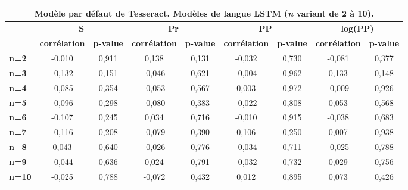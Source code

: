 \documentclass[10pt,twoside]{article}
\begin{document}
\begin{table}
\begin{center}
\begin{scriptsize}
\begin{tabular}{|l|c|c|c|c|c|c|c|c|}
    \multicolumn{9}{c}{{\footnotesize Modèle par défaut de Tesseract. Modèles de langue LSTM (\textit{n} variant de 2 à 10).}}\\\hline
    \multirow{2}{*}{\textbf{}} & \multicolumn{2}{c|}{\textbf{S}}         & \multicolumn{2}{c|}{\textbf{Pr}}        & \multicolumn{2}{c|}{\textbf{PP}}        & \multicolumn{2}{c|}{\textbf{log(PP)}}   \\ \cline{2-9} 
                               & \textbf{corrélation} & \textbf{p-value} & \textbf{corrélation} & \textbf{p-value} & \textbf{corrélation} & \textbf{p-value} & \textbf{corrélation} & \textbf{p-value} \\ \hline
    \textbf{n=2}  & -0,010 & 0,911 & 0,138  & 0,131 & -0,032 & 0,730 & -0,081 & 0,377 \\ \hline
    \textbf{n=3}  & -0,132 & 0,151 & -0,046 & 0,621 & -0,004 & 0,962 & 0,133  & 0,148 \\ \hline
    \textbf{n=4}  & -0,085 & 0,354 & -0,053 & 0,567 & 0,003  & 0,972 & -0,009 & 0,926 \\ \hline
    \textbf{n=5}  & -0,096 & 0,298 & -0,080 & 0,383 & -0,022 & 0,808 & 0,053  & 0,568 \\ \hline
    \textbf{n=6}  & -0,107 & 0,245 & 0,034  & 0,716 & -0,010 & 0,915 & -0,038 & 0,683 \\ \hline
    \textbf{n=7}  & -0,116 & 0,208 & -0,079 & 0,390 & 0,106  & 0,250 & 0,007  & 0,938 \\ \hline
    \textbf{n=8}  & 0,043  & 0,640 & -0,026 & 0,776 & -0,034 & 0,711 & -0,025 & 0,788 \\ \hline
    \textbf{n=9}  & -0,044 & 0,636 & 0,024  & 0,791 & -0,032 & 0,732 & 0,029  & 0,756 \\ \hline
    \textbf{n=10} & -0,025 & 0,788 & -0,072 & 0,432 & 0,012  & 0,895 & 0,073  & 0,426 \\ \hline
    
\end{tabular}
    \end{scriptsize}\end{center}\end{table}
\end{document}
